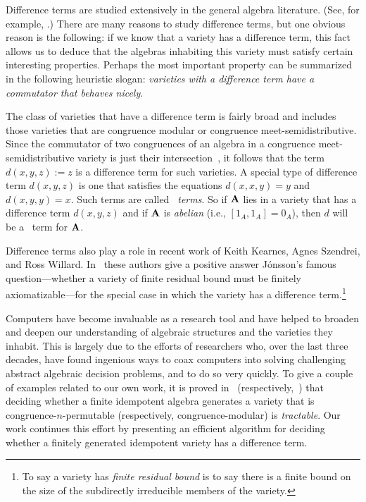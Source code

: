 Difference terms are studied extensively in the general algebra literature. (See, for example, \cite{MR3449235,MR1358491,MR3076179,MR1663558,KSW}.) There are many reasons to study difference terms, but
one obvious reason is the following: if we know that a variety has a difference term, this fact allows us to deduce that the algebras inhabiting this variety must satisfy certain interesting properties.  Perhaps the most important property can be summarized in the following heuristic slogan: \emph{varieties with a difference term have a commutator that behaves nicely}.  
  
The class of varieties that have a difference term is fairly broad and includes those varieties that are congruence modular or congruence meet-semidistributive. Since the commutator of two congruences of an algebra in a congruence meet-semidistributive variety is just their intersection~\cite{MR1663558}, it follows that the term $d(x,y,z) := z$ is a difference term for such varieties.  A special type of difference term $d(x,y,z)$ is one that satisfies the equations $d(x,x,y) = y$ and $d(x,y,y) = x$.  Such terms are called \emph{\malcev\ terms}. So if $\mathbf{A}$ lies in a variety that has a difference term $d(x,y,z)$ and if $\mathbf{A}$ is \emph{abelian} (i.e., $[1_A, 1_A] = 0_A$), then $d$ will be a \malcev\ term for $\mathbf{A}$.
  
Difference terms also play a role in recent work of Keith Kearnes,
Agnes Szendrei, and Ross Willard. In~\cite{MR3449235} these authors give a positive answer J\'onsson's famous question---whether a variety of finite residual bound must be finitely axiomatizable---for the
special case in which the variety has a difference term.\footnote{To say a variety has \emph{finite residual bound} is to say there is a finite bound on the size of the subdirectly irreducible members of the variety.}
  
Computers have become invaluable as a research tool and have helped to
broaden and deepen our understanding of algebraic structures and the
varieties they inhabit.  This is largely due to the efforts
of researchers who, over the last three decades, have found ingenious
ways to coax computers into solving challenging abstract algebraic
decision problems, and to do so very quickly.
To give a couple of examples related to our own work,
it is proved in~\cite{MR3239624} (respectively,~\cite{Freese:2009})
that deciding whether a finite idempotent algebra generates a variety that is congruence-$n$-permutable
(respectively, congruence-modular) is \emph{tractable}.
Our work continues this effort by presenting an efficient
algorithm for deciding whether a finitely generated idempotent variety has a difference term.


